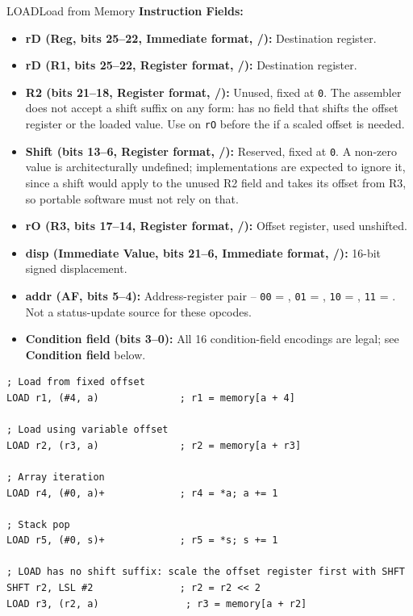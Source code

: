 \begin{instructionbox}{LOAD}{Load from Memory}
	\textbf{Instruction Fields:}
	\begin{itemize}
		\item \textbf{rD (Reg, bits 25--22, Immediate format, /):} Destination register.
		\item \textbf{rD (R1, bits 25--22, Register format, /):} Destination register.
		\item \textbf{R2 (bits 21--18, Register format, /):} Unused, fixed at \texttt{0}. The
		      assembler does not accept a shift suffix on any  form:  has no field that
		      shifts the offset register or the loaded value. Use  on \texttt{rO} before the
		       if a scaled offset is needed.
		\item \textbf{Shift (bits 13--6, Register format, /):} Reserved, fixed at \texttt{0}. A
		      non-zero value is architecturally undefined; implementations are expected to ignore it, since a shift would apply
		      to the unused R2 field and  takes its offset from R3, so portable software must not rely on that.
		\item \textbf{rO (R3, bits 17--14, Register format, /):} Offset register, used unshifted.
		\item \textbf{disp (Immediate Value, bits 21--6, Immediate format, /):} 16-bit signed
		      displacement.
		\item \textbf{addr (AF, bits 5--4):} Address-register pair -- \texttt{00} = , \texttt{01} = ,
		      \texttt{10} = , \texttt{11} = . Not a status-update source for these opcodes.
		\item \textbf{Condition field (bits 3--0):} All 16 condition-field encodings are legal; see \textbf{Condition
			      field} below.
	\end{itemize}

	\begin{example}
		\begin{lstlisting}
; Load from fixed offset
LOAD r1, (#4, a)              ; r1 = memory[a + 4]

; Load using variable offset
LOAD r2, (r3, a)              ; r2 = memory[a + r3]

; Array iteration
LOAD r4, (#0, a)+             ; r4 = *a; a += 1

; Stack pop
LOAD r5, (#0, s)+             ; r5 = *s; s += 1

; LOAD has no shift suffix: scale the offset register first with SHFT
SHFT r2, LSL #2               ; r2 = r2 << 2
LOAD r3, (r2, a)               ; r3 = memory[a + r2]
		\end{lstlisting}
		\caption{Indirect, Post-Increment, and Register-Offset Loads}
	\end{example}
\end{instructionbox}


